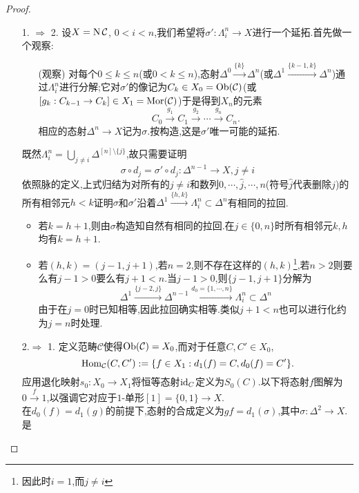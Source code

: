 \begin{proof}
    \begin{enumerate}
        \item[1. $\Rightarrow$ 2.]设$X = \operatorname{N} \mathcal{C}$, $0<i<n$,我们希望将$\sigma' : \Lambda_i^n \to X$进行一个延拓.首先做一个观察:
        \begin{enumerate}
            \item[(观察)]对每个$0\leq k \leq n$(或$0<k \leq n$),态射$\Delta^0 \xrightarrow{\{k\}}\Delta^n$(或$\Delta^1 \xrightarrow{\{k-1,k\}}\Delta^n$)通过$\Lambda_i^n$进行分解;它对$\sigma'$的像记为$C_k \in X_0 = \operatorname{Ob}(\mathcal{C})$(或$[g_k:C_{k-1} \to C_k]\in X_1 = \operatorname{Mor}(\mathcal{C})$)于是得到$X_n$的元素
            \[
            C_0 \xrightarrow{g_1}C_1 \xrightarrow{g_2}\cdots \xrightarrow{g_n} C_n.
            \]
            相应的态射$\Delta^n \to X$记为$\sigma$.按构造,这是$\sigma'$唯一可能的延拓.
        \end{enumerate}
        既然$\Lambda_i^n = \bigcup_{j\neq i}\Delta^{[n]\setminus \{j\}}$,故只需要证明
        \[
        \sigma \circ d_j = \sigma' \circ d_j: \Delta^{n-1} \to X, j\neq i
        \]
        依照脉的定义,上式归结为对所有的$j \neq i$和数列$0,\cdots, \hat{j} ,\cdots , n$(符号$\hat{j}$代表删除$j$)的所有相邻元$h<k$证明$\sigma$和$\sigma'$沿着$\Delta^1 \xrightarrow{\{h,k\}}\Lambda_i^n \subset \Delta^n$有相同的拉回.
        \begin{itemize}
            \item 若$k = h+1$,则由$\sigma$构造知自然有相同的拉回.在$j \in \{0,n\}$时所有相邻元$k,h$均有$k=h+1$.
            \item 若$(h,k)= (j-1,j+1)$,若$n=2$,则不存在这样的$(h,k)$\footnote{因此时$i=1$,而$j \neq i$},若$n>2$则要么有$j-1>0$要么有$j+1<n$.当$j-1>0$,则$\{j-1,j+1\}$分解为
            \[
            \Delta^1 \xrightarrow{\{j-2,j\}}\Delta^{n-1}\xrightarrow{d_0=\{1,\cdots,n\}}\Lambda_i^n \subset \Delta^n
            \]
            由于在$j=0$时已知相等,因此拉回确实相等.类似$j+1<n$也可以进行化约为$j=n$时处理.
        \end{itemize}
        \item[2.$\Rightarrow$ 1.]定义范畴$\mathcal{C}$使得$\operatorname{Ob}(\mathcal{C}) = X_0$,而对于任意$C,C'\in X_0$,
        \[
        \operatorname{Hom}_{\mathcal{C}}(C,C') :=\{f\in X_1: d_1(f)= C,d_0 (f) = C'\}.
        \]
        应用退化映射$s_0 : X_0 \to X_1$将恒等态射$\mathrm{id}_C$定义为$S_0(C)$.以下将态射$f$图解为$0 \xrightarrow{f} 1$,以强调它对应于$1$-单形$[1] = \{0,1\} \to X$.\\
        在$d_0(f)= d_1(g)$的前提下,态射的合成定义为$gf = d_1(\sigma)$,其中$\sigma : \Delta^2 \to X$.是

\end{enumerate}
\end{proof}
